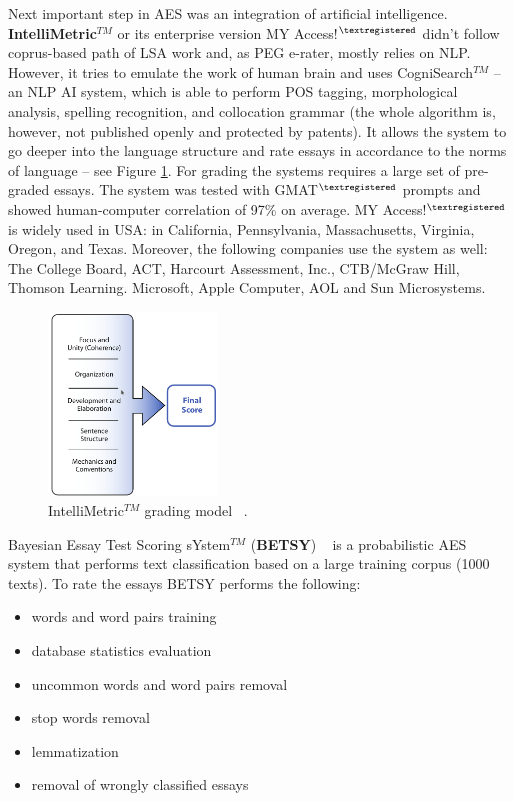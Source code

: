 Next important step in AES was an integration of artificial intelligence. \textbf{IntelliMetric$^{TM}$} or its enterprise version MY Access!$^{\tiny{\textregistered}}$ didn't follow coprus-based path of LSA work and, as PEG e-rater, mostly relies on NLP. However, it tries to emulate the work of human brain and uses CogniSearch$^{TM}$ -- an NLP AI system, which is able to perform POS tagging, morphological analysis, spelling recognition, and collocation grammar (the whole algorithm is, however, not published openly and  protected by patents). It allows the system to go deeper into the language structure and rate essays in accordance to the norms of language -- see Figure \ref{fig:IntelliMetric}. For grading the systems requires a large set of pre-graded essays. The system was tested with GMAT$^{\tiny{\textregistered}}$ prompts and showed human-computer correlation of 97\% on average. MY Access!$^{\tiny{\textregistered}}$ is widely used in USA: in California, Pennsylvania, Massachusetts, Virginia, Oregon, and Texas. Moreover, the following companies use the system as well: The College Board, ACT, Harcourt Assessment, Inc., CTB/McGraw Hill, Thomson Learning. Microsoft, Apple Computer, AOL and Sun Microsystems. 

\begin{figure}[h!]
  \centering
  \includegraphics[width=0.4\textwidth]{img/IntelliMetric}
    \caption{IntelliMetric$^{TM}$ grading model ~\cite{aesOverview}.\label{fig:IntelliMetric}}
\end{figure}

Bayesian Essay Test Scoring sYstem$^{TM}$ (\textbf{BETSY}) ~\cite{BETSY} is a probabilistic AES system that performs text classification based on a large training corpus (1000 texts). To rate the essays BETSY performs the following:

\begin{itemize}
\item words and word pairs training
\item database statistics evaluation
\item uncommon words and word pairs removal
\item stop words removal
\item lemmatization
\item removal of wrongly classified essays 
\end{itemize}

